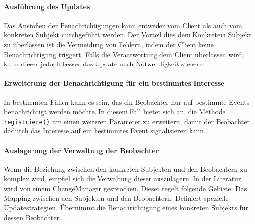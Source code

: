 \paragraph{Ausführung des Updates} Das Anstoßen der Benachrichtigungen kann entweder vom Client als auch vom konkreten Subjekt durchgeführt werden. Der Vorteil dies dem Konkretem Subjekt zu überlassen ist die Vermeidung von Fehlern, indem der Client keine Benachrichtigung triggert. Falls die Verantwortung dem Client überlassen wird, kann dieser jedoch besser das Update nach Notwendigkeit steuern.



\paragraph{Erweiterung der Benachrichtigung für ein bestimmtes Interesse} In bestimmten Fällen kann es sein, das ein Beobachter nur auf bestimmte Events benachrichtigt werden möchte. In diesem Fall bietet sich an,  die Methode \texttt{registriere()} um einen weiteren Parameter zu erweitern, damit der Beobachter dadurch das Interesse auf ein bestimmtes Event signalisieren kann.

\paragraph{Auslagerung der Verwaltung der Beobachter} Wenn die Beziehung zwischen den konkreten Subjekten und den Beobachtern zu komplex wird, empfiel sich die Verwaltung dieser auszulagern. In der Literatur wird von einem ChangeManager gesprochen. Dieser regelt folgende Gebiete: Das Mapping zwischen den Subjekten und den Beobachtern. Definiert spezielle Updatestrategien. Übernimmt die Benachrichtigung eines konkreten Subjekts für dessen Beobachter.



